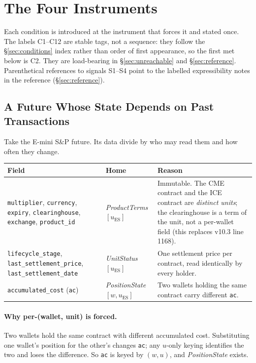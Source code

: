 \documentclass[11pt,a4paper]{article}
\begin{document}
\section{The Four Instruments}
\label{sec:testcases}

Each condition is introduced at the instrument that forces it and stated once. The labels
C1--C12 are stable tags, not a sequence: they follow the \S\ref{sec:conditions} index rather
than order of first appearance, so the first met below is C2. They are load-bearing in
\S\ref{sec:unreachable} and \S\ref{sec:reference}. Parenthetical references to signals
S1--S4 point to the labelled expressibility notes in the reference (\S\ref{sec:reference}).

\subsection{A Future Whose State Depends on Past Transactions}
\label{sec:future}

Take the E-mini S\&P future. Its data divide by who may read them and how often they change.

\begin{longtable}{p{4.8cm}p{3.4cm}p{6.2cm}}
\toprule
\textbf{Field} & \textbf{Home} & \textbf{Reason} \\
\midrule
\texttt{multiplier}, \texttt{currency}, \texttt{expiry}, \texttt{clearinghouse},
\texttt{exchange}, \texttt{product\_id} & \emph{ProductTerms}$[u_{\mathrm{ES}}]$ &
Immutable. The CME contract and the ICE contract are \emph{distinct units}; the
clearinghouse is a term of the unit, not a per-wallet field (this replaces v10.3 line
1168). \\
\addlinespace
\texttt{lifecycle\_stage}, \texttt{last\_settlement\_price},
\texttt{last\_settlement\_date} & \emph{UnitStatus}$[u_{\mathrm{ES}}]$ & One settlement
price per contract, read identically by every holder. \\
\addlinespace
\texttt{accumulated\_cost} (\texttt{ac}) & \emph{PositionState}$[w,u_{\mathrm{ES}}]$ & Two
wallets holding the same contract carry different \texttt{ac}. \\
\bottomrule
\end{longtable}

\paragraph{Why per-(wallet, unit) is forced.}
Two wallets hold the same contract with different accumulated cost. Substituting one
wallet's position for the other's changes \texttt{ac}; any $u$-only keying identifies the
two and loses the difference. So \texttt{ac} is keyed by $(w,u)$, and \emph{PositionState}
exists.
\end{document}
